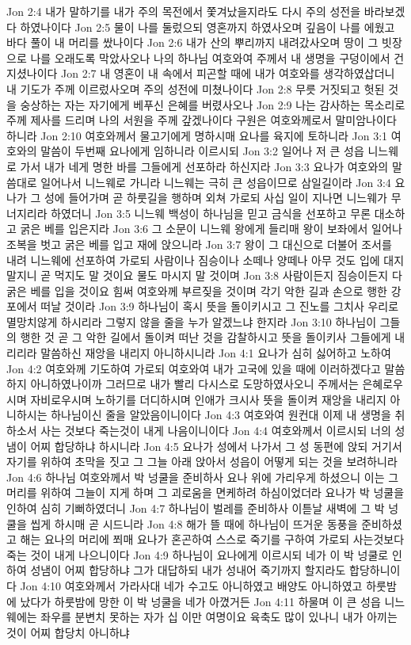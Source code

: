 Jon 2:4  내가 말하기를 내가 주의 목전에서 쫓겨났을지라도 다시 주의 성전을 바라보겠다 하였나이다
Jon 2:5  물이 나를 둘렀으되 영혼까지 하였사오며 깊음이 나를 에웠고 바다 풀이 내 머리를 쌌나이다
Jon 2:6  내가 산의 뿌리까지 내려갔사오며 땅이 그 빗장으로 나를 오래도록 막았사오나 나의 하나님 여호와여 주께서 내 생명을 구덩이에서 건지셨나이다
Jon 2:7  내 영혼이 내 속에서 피곤할 때에 내가 여호와를 생각하였삽더니 내 기도가 주께 이르렀사오며 주의 성전에 미쳤나이다
Jon 2:8  무릇 거짓되고 헛된 것을 숭상하는 자는 자기에게 베푸신 은혜를 버렸사오나
Jon 2:9  나는 감사하는 목소리로 주께 제사를 드리며 나의 서원을 주께 갚겠나이다 구원은 여호와께로서 말미암나이다 하니라
Jon 2:10  여호와께서 물고기에게 명하시매 요나를 육지에 토하니라
Jon 3:1  여호와의 말씀이 두번째 요나에게 임하니라 이르시되
Jon 3:2  일어나 저 큰 성읍 니느웨로 가서 내가 네게 명한 바를 그들에게 선포하라 하신지라
Jon 3:3  요나가 여호와의 말씀대로 일어나서 니느웨로 가니라 니느웨는 극히 큰 성읍이므로 삼일길이라
Jon 3:4  요나가 그 성에 들어가며 곧 하룻길을 행하며 외쳐 가로되 사십 일이 지나면 니느웨가 무너지리라 하였더니
Jon 3:5  니느웨 백성이 하나님을 믿고 금식을 선포하고 무론 대소하고 굵은 베를 입은지라
Jon 3:6  그 소문이 니느웨 왕에게 들리매 왕이 보좌에서 일어나 조복을 벗고 굵은 베를 입고 재에 앉으니라
Jon 3:7  왕이 그 대신으로 더불어 조서를 내려 니느웨에 선포하여 가로되 사람이나 짐승이나 소떼나 양떼나 아무 것도 입에 대지 말지니 곧 먹지도 말 것이요 물도 마시지 말 것이며
Jon 3:8  사람이든지 짐승이든지 다 굵은 베를 입을 것이요 힘써 여호와께 부르짖을 것이며 각기 악한 길과 손으로 행한 강포에서 떠날 것이라
Jon 3:9  하나님이 혹시 뜻을 돌이키시고 그 진노를 그치사 우리로 멸망치않게 하시리라 그렇지 않을 줄을 누가 알겠느냐 한지라
Jon 3:10  하나님이 그들의 행한 것 곧 그 악한 길에서 돌이켜 떠난 것을 감찰하시고 뜻을 돌이키사 그들에게 내리리라 말씀하신 재앙을 내리지 아니하시니라
Jon 4:1  요나가 심히 싫어하고 노하여
Jon 4:2  여호와께 기도하여 가로되 여호와여 내가 고국에 있을 때에 이러하겠다고 말씀하지 아니하였나이까 그러므로 내가 빨리 다시스로 도망하였사오니 주께서는 은혜로우시며 자비로우시며 노하기를 더디하시며 인애가 크시사 뜻을 돌이켜 재앙을 내리지 아니하시는 하나님이신 줄을 알았음이니이다
Jon 4:3  여호와여 원컨대 이제 내 생명을 취하소서 사는 것보다 죽는것이 내게 나음이니이다
Jon 4:4  여호와께서 이르시되 너의 성냄이 어찌 합당하냐 하시니라
Jon 4:5  요나가 성에서 나가서 그 성 동편에 앉되 거기서 자기를 위하여 초막을 짓고 그 그늘 아래 앉아서 성읍이 어떻게 되는 것을 보려하니라
Jon 4:6  하나님 여호와께서 박 넝쿨을 준비하사 요나 위에 가리우게 하셨으니 이는 그 머리를 위하여 그늘이 지게 하며 그 괴로움을 면케하려 하심이었더라 요나가 박 넝쿨을 인하여 심히 기뻐하였더니
Jon 4:7  하나님이 벌레를 준비하사 이튿날 새벽에 그 박 넝쿨을 씹게 하시매 곧 시드니라
Jon 4:8  해가 뜰 때에 하나님이 뜨거운 동풍을 준비하셨고 해는 요나의 머리에 쬐매 요나가 혼곤하여 스스로 죽기를 구하여 가로되 사는것보다 죽는 것이 내게 나으니이다
Jon 4:9  하나님이 요나에게 이르시되 네가 이 박 넝쿨로 인하여 성냄이 어찌 합당하냐 그가 대답하되 내가 성내어 죽기까지 할지라도 합당하니이다
Jon 4:10  여호와께서 가라사대 네가 수고도 아니하였고 배양도 아니하였고 하룻밤에 났다가 하룻밤에 망한 이 박 넝쿨을 네가 아꼈거든
Jon 4:11  하물며 이 큰 성읍 니느웨에는 좌우를 분변치 못하는 자가 십 이만 여명이요 육축도 많이 있나니 내가 아끼는 것이 어찌 합당치 아니하냐


